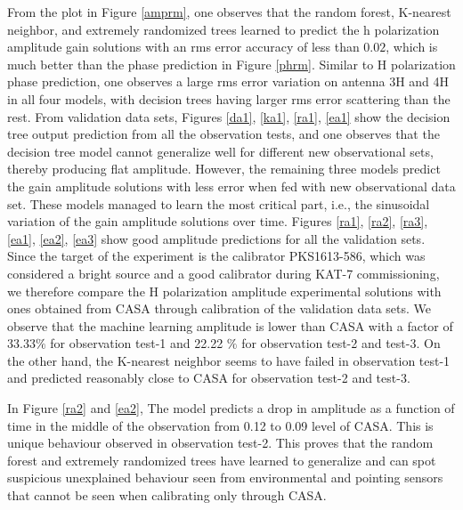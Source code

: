 From the plot in Figure \ref{amprm}, one observes that the random forest, K-nearest neighbor, and extremely randomized trees learned to predict the h polarization amplitude gain solutions with an rms error accuracy of less than $0.02$, which is much better than the phase prediction in Figure \ref{phrm}. Similar to H polarization phase prediction, one observes a large rms error variation on antenna 3H and 4H in all four models, with decision trees having larger rms error scattering than the rest. From validation data sets, Figures \ref{da1}, \ref{ka1}, \ref{ra1}, \ref{ea1} show the decision tree output prediction from all the observation tests, and one observes that the decision tree model cannot generalize well for different new observational sets, thereby producing flat amplitude. However, the remaining three models predict the gain amplitude solutions with less error when fed with new observational data set. These models managed to learn the most critical part, i.e., the sinusoidal variation of the gain amplitude solutions over time. Figures \ref{ra1}, \ref{ra2}, \ref{ra3}, \ref{ea1}, \ref{ea2}, \ref{ea3} show good amplitude predictions for all the validation sets. Since the target of the experiment is the calibrator PKS1613-586, which was considered a bright source and a good calibrator during KAT-7 commissioning, we therefore compare the H polarization amplitude experimental solutions with ones obtained from CASA through calibration of the validation data sets. We observe that the machine learning amplitude is lower than CASA with a factor of 33.33$\%$ for observation test-1 and 22.22 $\%$ for observation test-2 and test-3. On the other hand, the K-nearest neighbor seems to have failed in observation test-1 and predicted reasonably close to CASA for observation test-2 and test-3.

In Figure \ref{ra2} and \ref{ea2}, The model predicts a drop in amplitude as a function of time in the middle of the observation from 0.12 to 0.09 level of CASA. This is unique behaviour observed in observation test-2. This proves that the random forest and extremely randomized trees have learned to generalize and can spot suspicious unexplained behaviour seen from environmental and pointing sensors that cannot be seen when calibrating only through CASA.  
